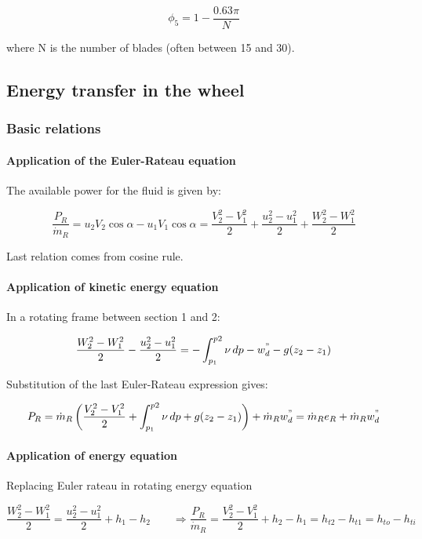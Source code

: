 \begin{equation}
\phi _5 = 1- \frac{0.63 \pi}{N}
\end{equation}

where N is the number of blades (often between 15 and 30). 

\subsection{Energy transfer in the wheel}
\subsubsection{Basic relations}
\paragraph{Application of the Euler-Rateau equation}
The available power for the fluid is given by: 

\begin{equation}
\frac{P_R}{\dot{m}_R} = u_2V_2\cos \alpha - u_1V_1 \cos \alpha = \frac{V_2^2-V_1^2}{2} + \frac{u_2^2-u_1^2}{2} +\frac{W_2^2-W_1^2}{2}
\end{equation}

Last relation comes from cosine rule. 

\paragraph{Application of kinetic energy equation}
In a rotating frame between section 1 and 2: 

\begin{equation}
\frac{W_2^2-W_1^2}{2} - \frac{u_2^2-u_1^2}{2} = - \int _{p_1}^{p2} \nu \, dp - w^"_d - g(z_2-z_1)
\end{equation}

Substitution of the last Euler-Rateau expression gives: 

\begin{equation}
P_R = \dot{m}_R \left( \frac{V_2^2-V_1^2}{2} + \int _{p_1}^{p2} \nu \, dp + g(z_2-z_1) \right) + \dot{m}_R w^"_d = \dot{m}_Re_R + \dot{m}_R w^"_d
\end{equation}

\paragraph{Application of energy equation}
Replacing Euler rateau in rotating energy equation

\begin{equation}
\frac{W_2^2-W_1^2}{2}  = \frac{u_2^2-u_1^2}{2} + h_1-h_2 \qquad \Rightarrow \frac{P_R}{\dot{m}_R} = \frac{V_2^2-V_1^2}{2} + h_2 - h_1 = h_{t2}-h_{t1} = h_{to} - h_{ti}
\end{equation}

